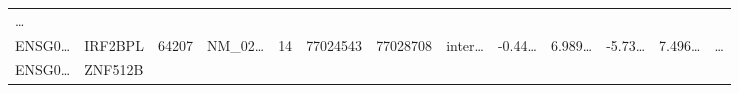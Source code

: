 \documentclass[
]{article}
\begin{document}
\begin{longtable}[]{@{}lllllllllllll@{}}
\begin{minipage}[t]{0.02\columnwidth}
\ldots{}\strut
\end{minipage}\tabularnewline
\begin{minipage}[t]{0.05\columnwidth}\raggedright
ENSG0\ldots{}\strut
\end{minipage} & \begin{minipage}[t]{0.05\columnwidth}\raggedright
IRF2BPL\strut
\end{minipage} & \begin{minipage}[t]{0.05\columnwidth}\raggedright
64207\strut
\end{minipage} & \begin{minipage}[t]{0.05\columnwidth}\raggedright
NM\_02\ldots{}\strut
\end{minipage} & \begin{minipage}[t]{0.05\columnwidth}\raggedright
14\strut
\end{minipage} & \begin{minipage}[t]{0.05\columnwidth}\raggedright
77024543\strut
\end{minipage} & \begin{minipage}[t]{0.05\columnwidth}\raggedright
77028708\strut
\end{minipage} & \begin{minipage}[t]{0.05\columnwidth}\raggedright
inter\ldots{}\strut
\end{minipage} & \begin{minipage}[t]{0.05\columnwidth}\raggedright
-0.44\ldots{}\strut
\end{minipage} & \begin{minipage}[t]{0.05\columnwidth}\raggedright
6.989\ldots{}\strut
\end{minipage} & \begin{minipage}[t]{0.05\columnwidth}\raggedright
-5.73\ldots{}\strut
\end{minipage} & \begin{minipage}[t]{0.05\columnwidth}\raggedright
7.496\ldots{}\strut
\end{minipage} & \begin{minipage}[t]{0.02\columnwidth}\raggedright
\ldots{}\strut
\end{minipage}\tabularnewline
\begin{minipage}[t]{0.05\columnwidth}\raggedright
ENSG0\ldots{}\strut
\end{minipage} & \begin{minipage}[t]{0.05\columnwidth}\raggedright
ZNF512B\strut
\end{minipage} & \begin{minipage}[t]{0.05\columnwidth}\raggedright

\end{minipage}
\end{longtable}
\end{document}
